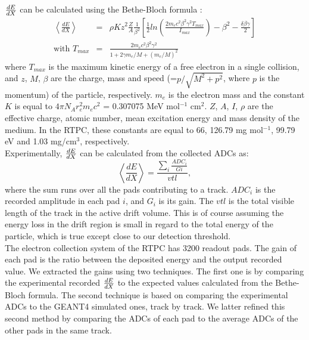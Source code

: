$\small{\frac{dE}{dX}}$ can be calculated using the Bethe-Bloch formula \cite{bethe_block}:
\begin{eqnarray}
\left\langle \frac{dE}{dX} \right\rangle &=& \rho K z^{2} \frac{Z}{A} 
   \frac{1}{\beta^{2}} \left[ \frac{1}{2} ln 
   \left(\frac{2m_{e}c^{2}\beta^{2}\gamma^{2}T_{max}}{I_{max}} \right) - 
\beta^{2} -\frac{\delta\beta\gamma}{2}\right]\\
\text{with }
T_{max} &=& \frac{2m_{e}c^{2}\beta^{2}\gamma^{2}}{1+2\gamma m_{e}/M + (m_{e}/M)^{2}} 
\end{eqnarray}
where $T_{max}$ is the maximum kinetic energy of a free electron in a single 
collision, and $z$, $M$, $\beta$ are the charge, mass and speed (=$p/ \sqrt{M^2 
+ p^2}$, where $p$ is the momentum) of the particle, respectively.  $m_{e}$ is 
the electron mass and the constant $K$ is equal to $4 \pi N_{A} 
r^{2}_{e}m_{e}c^{2}$ = 0.307075 MeV mol$^{-1}$ cm$^{2}$. $Z$, $A$, $I$, $\rho$ 
are the effective charge, atomic number, mean excitation energy and mass 
density of the medium. In the RTPC, these constants are equal to 66, 126.79 mg 
mol$^{-1}$, 99.79 eV and 1.03 mg/cm$^3$, respectively. \\

Experimentally, $\small{\frac{dE}{dX}}$ can be calculated from the collected ADCs as: 
\begin{equation}
 \left\langle \frac{dE}{dX} \right\rangle= \frac{\sum\limits_{i} \frac{ADC_{i}}{Gi}}{vtl},
\end{equation}
where the sum runs over all the pads contributing to a track. $ADC_{i}$ is the 
recorded amplitude in each pad $i$, and $G_{i}$ is its gain. The $vtl$ is the 
total visible length of the track in the active drift volume. This is of course 
assuming the energy loss in the drift region is small in regard to the total 
energy of the particle, which is true except close to our detection 
threshold.\\

The electron collection system of the RTPC has 3200 readout pads. The gain of 
each pad is the ratio between the deposited energy and the output recorded 
value. We extracted the gains using two techniques. The first one is by 
comparing the experimental recorded $\small{\frac{dE}{dX}}$ to the expected 
values calculated from the Bethe-Bloch formula. The second technique is based 
on comparing the experimental ADCs to the GEANT4 simulated ones, track by 
track. We latter refined this second method by comparing the ADCs of each pad 
to the average ADCs of the other pads in the same track.\\

